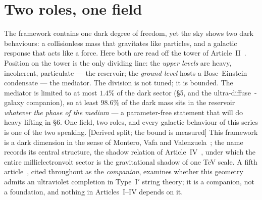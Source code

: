 \begin{abstract}
move the conclusion. Finally, the universality of the baryon--medium coupling --- long an open structural question --- is bounded by data in this article: a mass-to-light-marginalised analysis of 171 SPARC~\cite{SPARC,McGaugh16} galaxies limits any composition dependence to $|\Delta\alpha_{b}/\alpha_{b}|\leq9\%$ at the standard stellar mass-to-light ratio, and $\leq14\%$ across its plausible range, an order of magnitude above the $\sim0.7\%$ the covariant vertex predicts: compatible, not yet tested, and now a measurement target rather than an assumption.
\end{abstract}

\section{Two roles, one field}
The framework contains one dark degree of freedom, yet the sky shows two dark behaviours: a collisionless mass that gravitates like particles, and a galactic response that acts like a force. Here both are read off the tower of Article~II~\cite{DDF2}. Position on the tower is the only dividing line: the \emph{upper levels} are heavy, incoherent, particulate --- the reservoir; the \emph{ground level} hosts a Bose--Einstein condensate --- the mediator. The division is not tuned; it is bounded. The mediator is limited to at most $1.4\%$ of the dark sector (\S5, and the ultra-diffuse~\cite{vanDokkum,Mancera}-galaxy companion), so at least $98.6\%$ of the dark mass sits in the reservoir \emph{whatever the phase of the medium} --- a parameter-free statement that will do heavy lifting in \S6. One field, two roles, and every galactic behaviour of this series is one of the two speaking. [Derived split; the bound is measured] This framework is a dark dimension in the sense of Montero, Vafa and Valenzuela~\cite{MVV}; the name records its central structure, the shadow relation of Article~IV~\cite{DDF4}, under which the entire millielectronvolt sector is the gravitational shadow of one TeV scale. A fifth article~\cite{DDF5}, cited throughout as the \emph{companion}, examines whether this geometry admits an ultraviolet completion in Type~I$'$ string theory; it is a companion, not a foundation, and nothing in Articles~I--IV depends on it.

